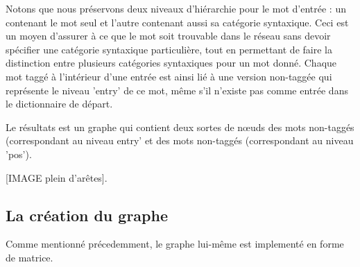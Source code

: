 Notons que nous préservons deux niveaux d'hiérarchie pour le mot d'entrée : un 
contenant le mot seul et l'autre contenant aussi sa catégorie syntaxique. Ceci 
est un moyen d'assurer à ce que le mot soit trouvable dans le réseau sans devoir 
spécifier une catégorie syntaxique particulière, tout en permettant de faire la 
distinction entre plusieurs catégories syntaxiques pour un mot donné. Chaque mot 
taggé à l'intérieur d'une entrée est ainsi lié à une version non-taggée qui 
représente le niveau 'entry' de ce mot, même s'il n'existe pas comme entrée dans 
le dictionnaire de départ.

Le résultats est un graphe qui contient deux sortes de nœuds des mots non-taggés 
(correspondant au niveau entry' et des mots non-taggés (correspondant au niveau 
'pos').

[IMAGE plein d'arêtes].

\subsection{La création du graphe}
Comme mentionné précedemment, le graphe lui-même est implementé en forme de 
matrice.

